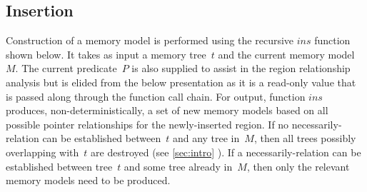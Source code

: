 \subsection{Insertion}
Construction of a memory model is performed
using the recursive $\mathit{ins}$ function shown below.
It takes as input a memory tree~$t$ and the current memory model~$M$.
The current predicate~$P$ is also supplied
to assist in the region relationship analysis
but is elided from the below presentation as it is a read-only value
that is passed along through the function call chain.
For output, function $\mathit{ins}$ produces, non-deterministically,
a set of new memory models based on all possible pointer relationships
for the newly-inserted region.
If no necessarily-relation can be established between~$t$ and any tree in~$M$, then all trees possibly overlapping with~$t$ are destroyed (see \cref{sec:intro} ).
If a necessarily-relation can be established between tree~$t$ and some tree already in~$M$, then only the relevant memory models need to be produced.

